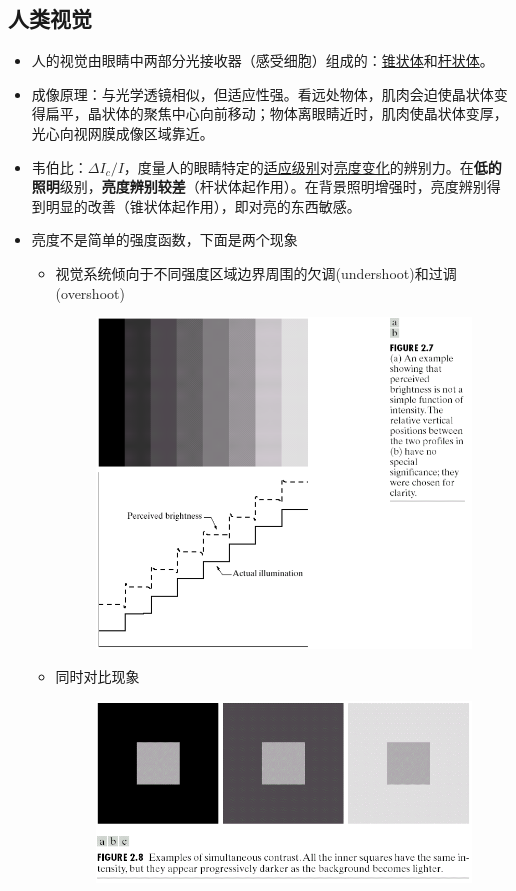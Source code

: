\subsection{人类视觉}
\begin{itemize}
\item 人的视觉由眼睛中两部分光接收器（感受细胞）组成的：\underline{锥状体}和\underline{杆状体}。
\item 成像原理：与光学透镜相似，但适应性强。看远处物体，肌肉会迫使晶状体变得扁平，晶状体的聚焦中心向前移动；物体离眼睛近时，肌肉使晶状体变厚，光心向视网膜成像区域靠近。
\item 韦伯比：$\Delta I_c/I$，度量人的眼睛特定的\underline{适应级别}对\underline{亮度变化}的辨别力。在\textbf{低的照明}级别，\textbf{亮度辨别较差}（杆状体起作用）。在背景照明增强时，亮度辨别得到明显的改善（锥状体起作用），即对亮的东西敏感。
\item 亮度不是简单的强度函数，下面是两个现象
\begin{itemize}
	\item 视觉系统倾向于不同强度区域边界周围的欠调(undershoot)和过调(overshoot)
	\begin{figure}[H]
	\centering
	\includegraphics[width=0.5\linewidth]{fig/undershoot-overshoot.png}
	\end{figure}
	\item 同时对比现象
	\begin{figure}[H]
	\centering
	\includegraphics[width=0.5\linewidth]{fig/simultaneous-contrast.png}
	\end{figure}
\end{itemize}
\end{itemize}

